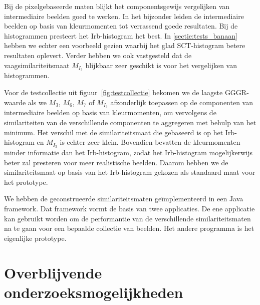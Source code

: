 Bij de pixelgebaseerde maten blijkt het componentsgewijs vergelijken van intermediaire
beelden goed te werken. In het bijzonder leiden de intermediaire beelden op basis van 
kleurmomenten tot verrassend goede resultaten. Bij de histogrammen presteert het 
Irb-histogram het best. In \ref{sectie:tests_banaan} hebben we echter een voorbeeld 
gezien waarbij het glad SCT-histogram betere resultaten oplevert. Verder hebben we
ook vastgesteld dat de vaagsimilariteitsmaat $M_{I_3}$ blijkbaar zeer 
geschikt is voor het vergelijken van histogrammen.

Voor de testcollectie uit figuur~\ref{fig:testcollectie} bekomen we de laagste 
GGGR-waarde als we $M_3$, $M_6$, $M_7$ of $M_{I_3}$ afzonderlijk toepassen op 
de componenten
van intermediaire beelden op basis van kleurmomenten, om vervolgens de
similariteiten van de verschillende componenten te aggregeren met behulp van
het minimum. Het verschil met de 
similariteitsmaat die gebaseerd is op het Irb-histogram en $M_{I_3}$ is echter 
zeer klein. Bovendien bevatten de kleurmomenten minder informatie dan het
Irb-histogram, zodat het Irb-histogram mogelijkerwijs beter zal presteren voor
meer realistische beelden. Daarom hebben we de similariteitsmaat op basis
van het Irb-histogram gekozen als standaard maat voor het prototype.

We hebben de geconstrueerde similariteitsmaten ge\"implementeerd in een
Java framework. Dat framework vormt de basis van twee applicaties. De ene
applicatie kan gebruikt worden om de performantie van de
verschillende similariteitsmaten na te gaan voor een bepaalde collectie
van beelden. Het andere programma is het eigenlijke prototype.

\section{Overblijvende onderzoeksmogelijkheden}

